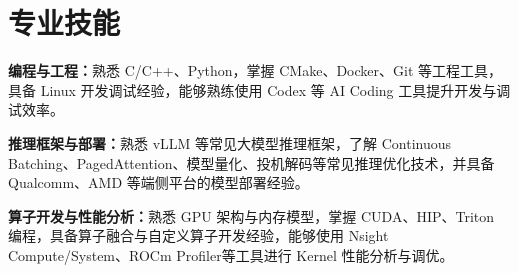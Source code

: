 \documentclass{resume}
\let\ResumeOriginalItemize\itemize
\let\ResumeOriginalEndItemize\enditemize
\renewenvironment{itemize}{%
  \ResumeOriginalItemize
  \addtolength{\topsep}{0.2em}%
  \addtolength{\itemsep}{0.2em}%
}{%
  \ResumeOriginalEndItemize
}
\begin{document}
\vspace{0.35em}
\section[专业技能]{专业技能}

\begin{itemize}
  \item \textbf{编程与工程：}熟悉 C/C++、Python，掌握 CMake、Docker、Git 等工程工具，具备 Linux 开发调试经验，能够熟练使用 Codex 等 AI Coding 工具提升开发与调试效率。

  \item \textbf{推理框架与部署：}熟悉 vLLM 等常见大模型推理框架，了解 Continuous Batching、PagedAttention、模型量化、投机解码等常见推理优化技术，并具备 Qualcomm、AMD 等端侧平台的模型部署经验。

  \item \textbf{算子开发与性能分析：}熟悉 GPU 架构与内存模型，掌握 CUDA、HIP、Triton 编程，具备算子融合与自定义算子开发经验，能够使用 Nsight Compute/System、ROCm Profiler等工具进行 Kernel 性能分析与调优。

\end{itemize}
\end{document}
